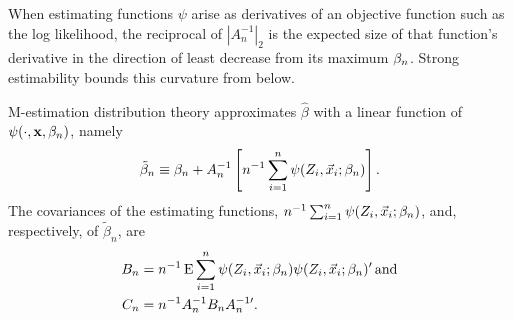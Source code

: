 \documentclass{article}
\theoremstyle{remark}
\begin{document}
When estimating functions $\psi$ arise as derivatives of an objective function such as the log likelihood, the reciprocal of $|{A}_{n}^{-1}|_{2}$ is the expected size of that function's derivative in the direction of least decrease from its maximum $\beta_{n }$. 
Strong estimability bounds this curvature from below.

M-estimation distribution theory approximates $\hat\beta$ with a linear function of $\psi(\cdot, \mathbf{x}, \beta_{n })$, namely 
\begin{equation}
  \label{eq:22}
  \tilde{\beta}_{n} \equiv \beta_{n } + A_{n}^{-1} \left[n^{-1}\sum_{i=1}^{n} \psi(Z_{i}, \vec{x}_{i}; \beta_{n } )\right].  
\end{equation}
The covariances of the estimating functions, $n^{-1} \sum_{i=1}^{n} \psi(Z_{i}, \vec{x}_{i}; \beta_{n } )$, and, respectively, of $\tilde{\beta}_{n}$, are 
\begin{align}
\label{eq:13}
B_{n}  &=  n^{-1}\operatorname{E}  \sum_{i=1}^{n} \psi(Z_{i}, \vec{x}_{i}; \beta_{n } ) \psi(Z_{i}, \vec{x}_{i};  \beta_{n } )' \, \mathrm{and} \\
C_{n} &= n^{-1}A_{n}^{-1}B_{n}A_{n}^{-1\prime}.\nonumber
\end{align}
\end{document}

